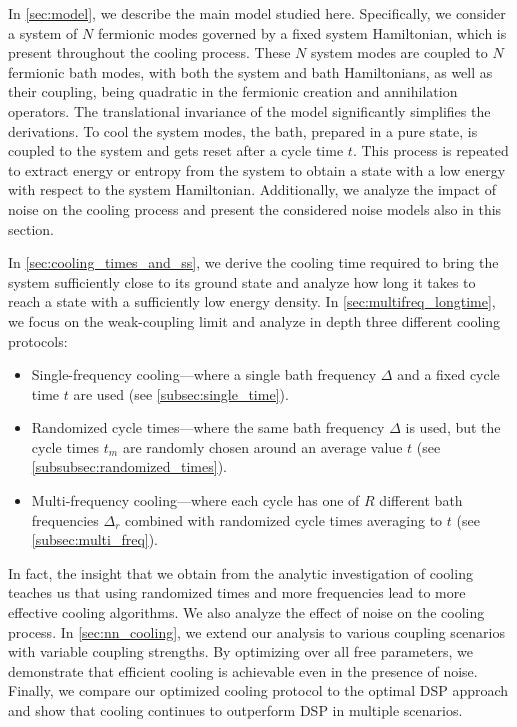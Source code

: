 \documentclass[aps,prx,twocolumn,superscriptaddress,nofootinbib,nolongbibliography,nobalancelastpage,10pt,floatfix]{revtex4-2}
\begin{document}
In \cref{sec:model}, we describe the main model studied here. Specifically, we consider a system of $N$ fermionic modes governed by a fixed system Hamiltonian, which is present throughout the cooling process. These $N$ system modes are coupled to $N$ fermionic bath modes, with both the system and bath Hamiltonians, as well as their coupling, being quadratic in the fermionic creation and annihilation operators. The translational invariance of the model significantly simplifies the derivations. To cool the system modes, the bath, prepared in a pure state, is coupled to the system and gets reset after a cycle time $t$. This process is repeated to extract energy or entropy from the system to obtain a state with a low energy with respect to the system Hamiltonian. Additionally, we analyze the impact of noise on the cooling process and present the considered noise models also in this section.

In \cref{sec:cooling_times_and_ss}, we derive the cooling time required to bring the system sufficiently close to its ground state and analyze how long it takes to reach a state with a sufficiently low energy density. In \cref{sec:multifreq_longtime}, we focus on the weak-coupling limit and analyze in depth three different cooling protocols:
\begin{itemize}
    \item Single-frequency cooling---where a single bath frequency $\Delta$ and a fixed cycle time $t$ are used (see \cref{subsec:single_time}).

    \item Randomized cycle times---where the same bath frequency $\Delta$ is used, but the cycle times $t_m$ are randomly chosen around an average value $t$ (see \cref{subsubsec:randomized_times}).

    \item Multi-frequency cooling---where each cycle has one of $R$ different bath frequencies $\Delta_r$ combined with randomized cycle times averaging to $t$ (see \cref{subsec:multi_freq}).
\end{itemize}
In fact, the insight that we obtain from the analytic investigation of cooling teaches us that using randomized times and more frequencies lead to more effective cooling algorithms. We also analyze the effect of noise on the cooling process.
In \cref{sec:nn_cooling}, we extend our analysis to various coupling scenarios with variable coupling strengths. By optimizing over all free parameters, we demonstrate that efficient cooling is achievable even in the presence of noise. Finally, we compare our optimized cooling protocol to the optimal DSP approach and show that cooling continues to outperform DSP in multiple scenarios.
\end{document}
